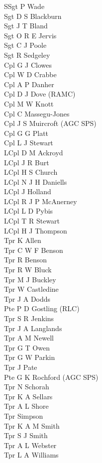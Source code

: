\begin{multicols}{2}
  \noindent
  SSgt P Wade \\
  Sgt D S Blackburn \\
  Sgt J T Bland \\
  Sgt O R E Jervis \\
  Sgt C J Poole \\
  Sgt R Sedgeley \\
  Cpl G J Clowes \\
  Cpl W D Crabbe \\
  Cpl A P Danher \\
  Cpl D J Dove (RAMC) \\
  Cpl M W Knott \\
  Cpl C Massegu-Jones \\
  Cpl J S Muircroft (AGC SPS) \\
  Cpl G G Platt \\
  Cpl L J Stewart \\
  LCpl D M Ackroyd \\
  LCpl J R Burt \\
  LCpl H S Church \\
  LCpl N J H Daniells \\
  LCpl J Holland \\
  LCpl R J P McAnerney \\
  LCpl L D Pybis \\
  LCpl T R Stewart \\
  LCpl H J Thompson \\
  Tpr K Allen \\
  Tpr C W F Benson \\
  Tpr R Benson \\
  Tpr R W Bluck \\
  Tpr M J Buckley \\
  Tpr W Castledine \\
  Tpr J A Dodds \\
  Pte P D Gostling (RLC) \\
  Tpr S R Jenkins \\
  Tpr J A Langlands \\
  Tpr A M Newell \\
  Tpr G T Owen \\
  Tpr G W Parkin \\
  Tpr J Pate \\
  Pte G K Rochford (AGC SPS) \\
  Tpr N Schorah \\
  Tpr K A Sellars \\
  Tpr A L Shore \\
  Tpr Simpson \\
  Tpr K A M Smith \\
  Tpr S J Smith \\
  Tpr A L Webster \\
  Tpr L A Williams \\
\end{multicols}

